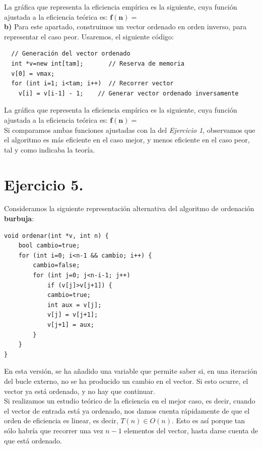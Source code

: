 \documentclass[11pt,a4paper]{article}
\newcommand{\bm}[1]{\boldsymbol{#1}}
\begin{document}
La gráfica que representa la eficiencia empírica es la siguiente, cuya función ajustada a la eficiencia teórica es: $\bm{f(n) = }$\\  %



\textbf{b)} Para este apartado, construimos un vector ordenado en orden inverso, para representar el caso peor. Usaremos, el siguiente código:

\begin{lstlisting}
  // Generación del vector ordenado
  int *v=new int[tam];       // Reserva de memoria
  v[0] = vmax;
  for (int i=1; i<tam; i++)  // Recorrer vector
    v[i] = v[i-1] - 1;    // Generar vector ordenado inversamente
\end{lstlisting}

La gráfica que representa la eficiencia empírica es la siguiente, cuya función ajustada a la eficiencia teórica es: $\bm{f(n) = }$\\  %


Si comparamos ambas funciones ajustadas con la del \textit{Ejercicio 1}, observamos que el algoritmo es más eficiente en el caso mejor, y menos eficiente en el caso peor, tal y como indicaba la teoría.

\section*{Ejercicio 5.}

Consideramos la siguiente representación alternativa del algoritmo de ordenación \textbf{burbuja}:

\begin{lstlisting}
void ordenar(int *v, int n) {
    bool cambio=true;
    for (int i=0; i<n-1 && cambio; i++) {
        cambio=false;
        for (int j=0; j<n-i-1; j++)
            if (v[j]>v[j+1]) {
            cambio=true;
            int aux = v[j];
            v[j] = v[j+1];
            v[j+1] = aux;
        }
    }
}
\end{lstlisting}

En esta versión, se ha añadido una variable que permite saber si, en una iteración del bucle externo, no se ha producido un cambio en el vector. Si esto ocurre, el vector ya está ordenado, y no hay que continuar.\\

Si realizamos un estudio teórico de la eficiencia en el mejor caso, es decir, cuando el vector de entrada está ya ordenado, nos damos cuenta rápidamente de que el orden de eficiencia es linear, es decir, $T(n) \in O(n)$. Esto es así porque tan sólo habría que recorrer una vez $n-1$ elementos del vector, hasta darse cuenta de que está ordenado.\\
\end{document}
